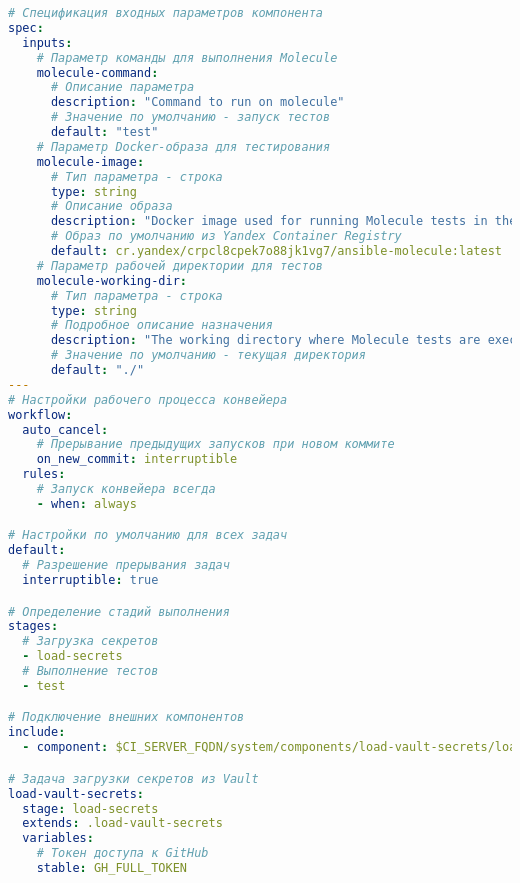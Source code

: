 \begin{lstlisting}[language=yaml,label={lst:component-pipeline}]
# Спецификация входных параметров компонента
spec:
  inputs:
    # Параметр команды для выполнения Molecule
    molecule-command:
      # Описание параметра
      description: "Command to run on molecule"
      # Значение по умолчанию - запуск тестов
      default: "test"
    # Параметр Docker-образа для тестирования
    molecule-image:
      # Тип параметра - строка
      type: string
      # Описание образа
      description: "Docker image used for running Molecule tests in the pipeline"
      # Образ по умолчанию из Yandex Container Registry
      default: cr.yandex/crpcl8cpek7o88jk1vg7/ansible-molecule:latest
    # Параметр рабочей директории для тестов
    molecule-working-dir:
      # Тип параметра - строка
      type: string
      # Подробное описание назначения
      description: "The working directory where Molecule tests are executed. This directory is set as the MOLECULE_PROJECT_DIRECTORY environment variable during the pipeline run."
      # Значение по умолчанию - текущая директория
      default: "./"
---
# Настройки рабочего процесса конвейера
workflow:
  auto_cancel:
    # Прерывание предыдущих запусков при новом коммите
    on_new_commit: interruptible
  rules:
    # Запуск конвейера всегда
    - when: always

# Настройки по умолчанию для всех задач
default:
  # Разрешение прерывания задач
  interruptible: true

# Определение стадий выполнения
stages:
  # Загрузка секретов
  - load-secrets
  # Выполнение тестов
  - test

# Подключение внешних компонентов
include:
  - component: $CI_SERVER_FQDN/system/components/load-vault-secrets/load-vault-secrets@2

# Задача загрузки секретов из Vault
load-vault-secrets:
  stage: load-secrets
  extends: .load-vault-secrets
  variables:
    # Токен доступа к GitHub
    stable: GH_FULL_TOKEN


\end{lstlisting}
